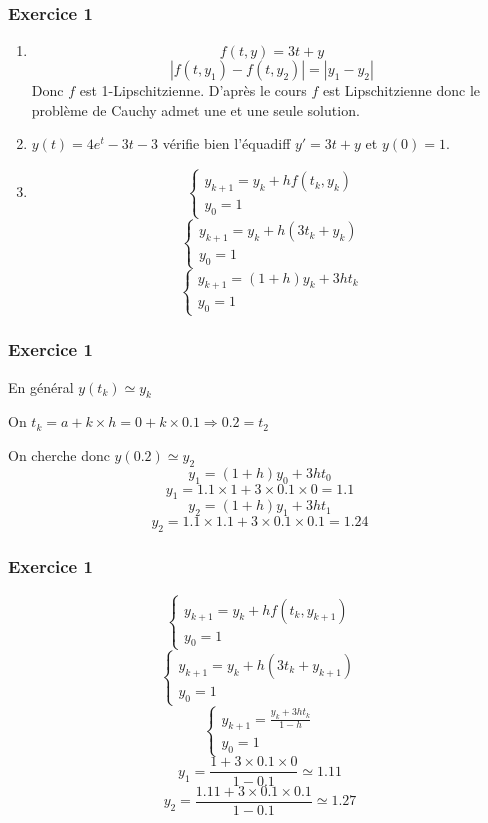 \documentclass{beamer}
\begin{document}
\begin{frame}
\frametitle{Exercice 1}
\begin{enumerate}
\item \[f(t,y)=3t+y\]
\[|f(t,y_1)-f(t,y_2)|=|y_1-y_2|\]
Donc $f$ est 1-Lipschitzienne. D'après le cours $f$ est Lipschitzienne donc le problème de Cauchy admet une et une seule solution.
\item  $y(t)=4 e^t-3t-3 $ vérifie bien l'équadiff $y'=3t+y$ et $y(0)=1$.
\item \[\left\{\begin{array}{l}
y_{k+1}=y_k+hf(t_k,y_k)\\
y_0=1
\end{array}\right.\]
 \[\left\{\begin{array}{l}
y_{k+1}=y_k+h(3t_k+y_k)\\
y_0=1
\end{array}\right.\]
\[\left\{\begin{array}{l}
y_{k+1}=(1+h)y_k+3ht_k\\
y_0=1
\end{array}\right.\]

\end{enumerate}


\end{frame}

\begin{frame}
\frametitle{Exercice 1}
En général $y(t_k)\simeq y_k$

On $t_k=a+k\times h=0+k\times 0.1 \Longrightarrow 0.2=t_2$

On cherche donc  $y(0.2)\simeq y_2$
\[y_{1}=(1+h)y_0+3ht_0\]
\[y_1=1.1\times 1+3\times 0.1\times 0=1.1\]
\[y_{2}=(1+h)y_1+3ht_1\]
\[y_2=1.1\times 1.1+3\times 0.1\times 0.1=1.24\]
\end{frame}


\begin{frame}
\frametitle{Exercice 1}
 \[\left\{\begin{array}{l}
y_{k+1}=y_k+hf(t_k,y_{k+1})\\
y_0=1
\end{array}\right.\]
 \[\left\{\begin{array}{l}
y_{k+1}=y_k+h(3t_k+y_{k+1})\\
y_0=1
\end{array}\right.\]
\[\left\{\begin{array}{l}
y_{k+1}=\frac{y_k+3ht_k}{1-h}\\
y_0=1
\end{array}\right.\]
 \[y_1=\frac{1+3\times 0.1\times 0}{1-0.1}\simeq 1.11 \]
 \[y_2=\frac{1.11+3\times 0.1\times 0.1}{1-0.1}\simeq 1.27 \]
 \end{frame}
 
\end{document}
